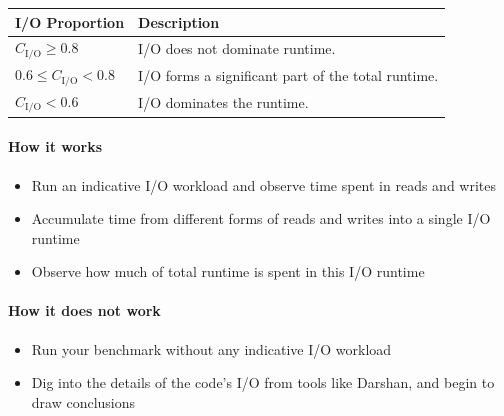 \begin{center}
 \begin{tabular}{p{}p{}}
  I/O Proportion & Description \\
  \hline
  $C_{\text{I/O}} \geq 0.8$
   & \cellcolor{green!25} I/O does not dominate runtime.
  \\
  $0.6 \leq C_{\text{I/O}} < 0.8$
   & \cellcolor{yellow!25} I/O forms a significant part of the total runtime.
  \\
  $C_{\text{I/O}} < 0.6$
   & \cellcolor{red!25} I/O dominates the runtime.
 \end{tabular}
\end{center}


\paragraph*{How it works}

\begin{itemize}[noitemsep]
  \item[$\boxplus$] Run an indicative I/O workload and observe time spent in reads and writes
  \item[$\boxplus$] Accumulate time from different forms of reads and writes into a single I/O runtime
  \item[$\boxplus$] Observe how much of total runtime is spent in this I/O runtime
\end{itemize}


\paragraph*{How it does not work}

\begin{itemize}[noitemsep]
  \item[$\boxminus$] Run your benchmark without any indicative I/O workload
  \item[$\boxminus$] Dig into the details of the code's I/O from tools like Darshan, and begin to draw conclusions
\end{itemize}
